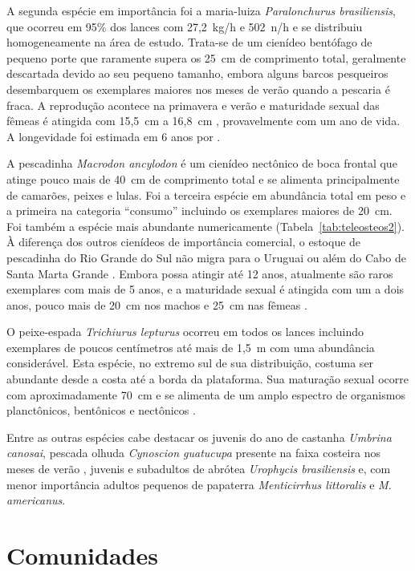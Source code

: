 \documentclass[a4paper,11pt,twoside,showtrims,onecolumn,openright,final]{memoir}
\begin{document}
A segunda espécie em importância foi a maria-luiza \emph{Paralonchurus brasiliensis}, 
que ocorreu em 95\% dos lances com 27,2~kg/h e 502~n/h e se distribuiu 
homogeneamente na área de estudo. Trata-se de um cienídeo bentófago de pequeno porte 
que raramente supera os 25~cm de comprimento total, geralmente descartada devido ao seu 
pequeno tamanho, embora alguns barcos pesqueiros desembarquem os exemplares maiores nos 
meses de verão quando a pescaria é fraca. A reprodução acontece na primavera e verão e 
maturidade sexual das fêmeas é atingida com 15,5~cm \citep{lewis2005} 
a 16,8~cm \citep{oliveira2000}, provavelmente com um ano de vida. A longevidade 
foi estimada em 6 anos por \citet{lewis2005}. 

A pescadinha \emph{Macrodon ancylodon} é um cienídeo nectônico de boca frontal que atinge pouco 
mais de 40~cm de comprimento total e se alimenta principalmente de camarões, peixes e lulas. 
Foi a terceira espécie em abundância total em peso e a primeira na categoria ``consumo'' incluindo 
os exemplares maiores de 20~cm. Foi também a espécie mais abundante numericamente (Tabela~\ref{tab:teleosteos2}). 
À diferença dos outros cienídeos de importância comercial, o estoque de pescadinha do Rio Grande do Sul 
não migra para o Uruguai ou além do Cabo de Santa Marta Grande \citep{yamaguti1979}. 
Embora possa atingir até 12 anos, atualmente são raros exemplares com mais de 5 anos, e 
a maturidade sexual é atingida com um a dois anos, pouco mais de 20~cm 
nos machos e 25~cm nas fêmeas \citep{haimovici1997}.

O peixe-espada \emph{Trichiurus lepturus} ocorreu em todos os lances incluindo exemplares 
de poucos centímetros até mais de 1,5~m com uma abundância considerável. Esta espécie, no extremo sul 
de sua distribuição, costuma ser abundante desde a costa até a borda da plataforma. Sua maturação sexual 
ocorre com aproximadamente 70~cm e se alimenta de um amplo espectro de organismos planctônicos, bentônicos 
e nectônicos \citep{martins2000,haimovici2005b}.

Entre as outras espécies cabe destacar os juvenis do ano de castanha \emph{Umbrina canosai}, 
pescada olhuda \emph{Cynoscion guatucupa} presente na faixa costeira nos meses de verão \citep{HAIMOVICI1996B}, 
juvenis e subadultos de abrótea \emph{Urophycis brasiliensis} e, com menor importância adultos pequenos 
de papaterra \emph{Menticirrhus littoralis} e \emph{M. americanus}.

\section*{Comunidades}
\end{document}
